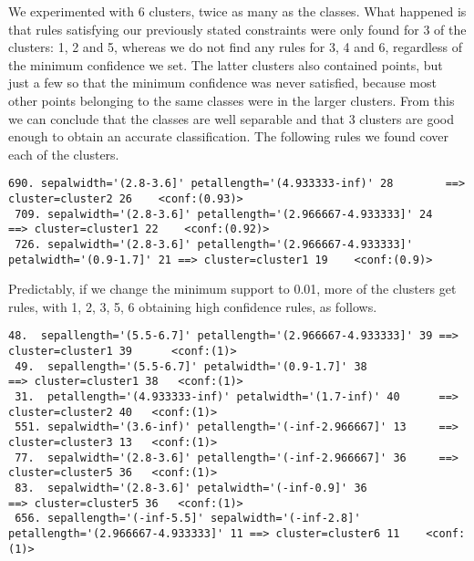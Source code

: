 \documentclass[]{article}
\begin{document}
We experimented with 6 clusters, twice as many as the classes. What happened is that rules satisfying our previously stated constraints were only found for 3 of the clusters: 1, 2 and 5, whereas we do not find any rules for 3, 4 and 6, regardless of the minimum confidence we set. The latter clusters also contained points, but just a few so that the minimum confidence was never satisfied, because most other points belonging to the same classes were in the larger clusters. From this we can conclude that the classes are well separable and that 3 clusters are good enough to obtain an accurate classification. The following rules we found cover each of the clusters.

\begin{lstlisting}[breaklines=true]
 690. sepalwidth='(2.8-3.6]' petallength='(4.933333-inf)' 28 		==> cluster=cluster2 26    <conf:(0.93)>
 709. sepalwidth='(2.8-3.6]' petallength='(2.966667-4.933333]' 24 	==> cluster=cluster1 22    <conf:(0.92)> 
 726. sepalwidth='(2.8-3.6]' petallength='(2.966667-4.933333]' petalwidth='(0.9-1.7]' 21 ==> cluster=cluster1 19    <conf:(0.9)>
\end{lstlisting}

Predictably, if we change the minimum support to 0.01, more of the clusters get rules, with 1, 2, 3, 5, 6 obtaining high confidence rules, as follows.

\begin{lstlisting}[breaklines=true]
 48.  sepallength='(5.5-6.7]' petallength='(2.966667-4.933333]' 39 ==> cluster=cluster1 39  	<conf:(1)> 
 49.  sepallength='(5.5-6.7]' petalwidth='(0.9-1.7]' 38 		 	  ==> cluster=cluster1 38   <conf:(1)> 
 31.  petallength='(4.933333-inf)' petalwidth='(1.7-inf)' 40 	  ==> cluster=cluster2 40   <conf:(1)> 
 551. sepalwidth='(3.6-inf)' petallength='(-inf-2.966667]' 13     ==> cluster=cluster3 13   <conf:(1)> 
 77.  sepalwidth='(2.8-3.6]' petallength='(-inf-2.966667]' 36 	  ==> cluster=cluster5 36   <conf:(1)>
 83.  sepalwidth='(2.8-3.6]' petalwidth='(-inf-0.9]' 36 			  ==> cluster=cluster5 36   <conf:(1)>
 656. sepallength='(-inf-5.5]' sepalwidth='(-inf-2.8]' petallength='(2.966667-4.933333]' 11 ==> cluster=cluster6 11    <conf:(1)> 
\end{lstlisting}
\end{document}
